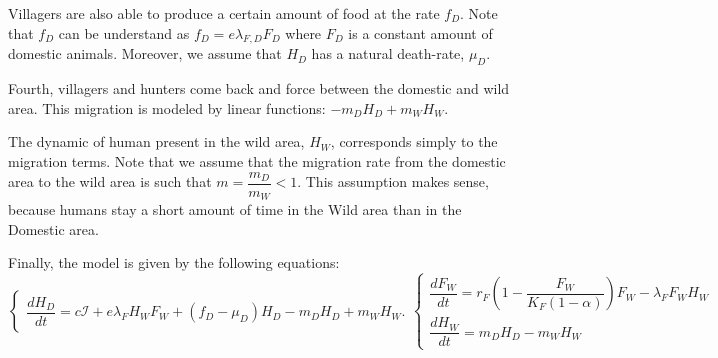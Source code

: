 \documentclass{article}
\newcommand{\lfw}{\lambda_{F}}
\newcommand{\lfd}{\lambda_{F, D}}
\newcommand{\lfw}{\lambda_{F}}
\newcommand{\cI}{c \mathcal{I}}
\begin{document}
Villagers are also able to produce a certain amount of food at the rate $f_D$. Note that $f_D$ can be understand as $f_D = e \lfd F_D$ where $F_D$ is a constant amount of domestic animals.
Moreover, we assume that $H_D$ has a natural death-rate, $\mu_D$.

Fourth, villagers and hunters come back and force between the domestic and wild area. This migration is modeled by linear functions: $-m_D H_D + m_W H_W$.

The dynamic of human present in the wild area, $H_W$, corresponds simply to the migration terms. Note that we assume that the migration rate from the domestic area to the wild area is such that $m = \dfrac{m_D}{m_W} < 1$. This assumption makes sense, because humans stay a short amount of time in the Wild area than in the Domestic area.

Finally, the model is given by the following equations:
\begin{subequations}
\begin{equation}
\left\{ \begin{array}{l}
\dfrac{dH_D}{dt}= \cI + e\lfw H_W F_W + (f_D - \mu_D) H_D - m_D H_D + m_W H_W.
\end{array}\right.
\end{equation}
\begin{equation}
\left\lbrace \begin{array}{l}
\dfrac{dF_W}{dt} = r_F \left(1 - \dfrac{F_W}{K_F(1-\alpha)} \right) F_W - \lfw F_W H_W \\
\dfrac{dH_W}{dt}= m_D H_D - m_W H_W 
\end{array} \right.
\end{equation}
\label{equationsHDFWHW}
\end{subequations}
\end{document}

